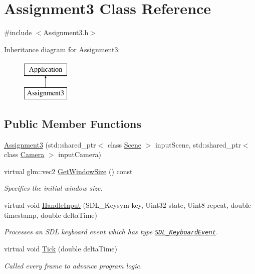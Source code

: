 \hypertarget{class_assignment3}{}\section{Assignment3 Class Reference}
\label{class_assignment3}


{\ttfamily \#include $<$Assignment3.\+h$>$}

Inheritance diagram for Assignment3\+:\begin{figure}[H]
\begin{center}
\leavevmode
\includegraphics[height=2.000000cm]{class_assignment3}
\end{center}
\end{figure}
\subsection*{Public Member Functions}
\begin{DoxyCompactItemize}
\item 
\hyperlink{class_assignment3_adb8e9ac0681c600affc3370f5e5422b2}{Assignment3} (std\+::shared\+\_\+ptr$<$ class \hyperlink{class_scene}{Scene} $>$ input\+Scene, std\+::shared\+\_\+ptr$<$ class \hyperlink{class_camera}{Camera} $>$ input\+Camera)
\item 
virtual glm\+::vec2 \hyperlink{class_assignment3_a895e38d50717c935706a719f4368f5e8}{Get\+Window\+Size} () const 
\begin{DoxyCompactList}\small\item\em Specifies the initial window size. \end{DoxyCompactList}\item 
virtual void \hyperlink{class_assignment3_a1cc65ca321f39eb7092959b2dada8d31}{Handle\+Input} (S\+D\+L\+\_\+\+Keysym key, Uint32 state, Uint8 repeat, double timestamp, double delta\+Time)
\begin{DoxyCompactList}\small\item\em Processes an S\+D\+L keyboard event which has type \href{https://wiki.libsdl.org/SDL_KeyboardEvent}{\tt S\+D\+L\+\_\+\+Keyboard\+Event}. \end{DoxyCompactList}\item 
virtual void \hyperlink{class_assignment3_a11256b6e7b38ab24baa92729cfb8ffe2}{Tick} (double delta\+Time)
\begin{DoxyCompactList}\small\item\em Called every frame to advance program logic. \end{DoxyCompactList}\end{DoxyCompactItemize}
